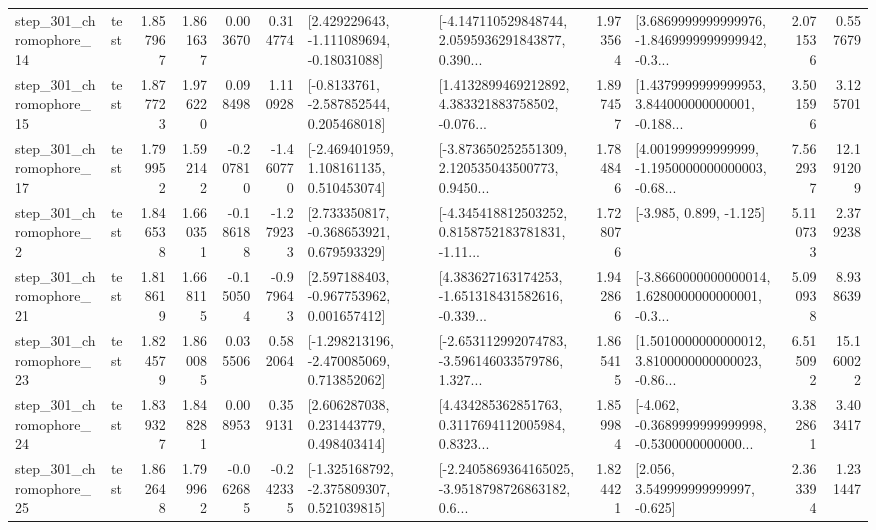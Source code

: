 \begin{tabular}{llrrrrllrlrr}
  step\_301\_chromophore\_14 &      test &      1.857967 &    1.861637 &      0.003670 &  0.314774 &    [2.429229643, -1.111089694, -0.18031088] &  [-4.147110529848744, 2.0595936291843877, 0.390... &       1.973564 &  [3.6869999999999976, -1.8469999999999942, -0.3... &            2.071536 &          0.557679 \\
  step\_301\_chromophore\_15 &      test &      1.877723 &    1.976220 &      0.098498 &  1.110928 &     [-0.8133761, -2.587852544, 0.205468018] &  [1.4132899469212892, 4.383321883758502, -0.076... &       1.897457 &  [1.4379999999999953, 3.844000000000001, -0.188... &            3.501596 &          3.125701 \\
  step\_301\_chromophore\_17 &      test &      1.799952 &    1.592142 &     -0.207810 & -1.460770 &    [-2.469401959, 1.108161135, 0.510453074] &  [-3.873650252551309, 2.120535043500773, 0.9450... &       1.784846 &  [4.001999999999999, -1.1950000000000003, -0.68... &            7.562937 &         12.191209 \\
   step\_301\_chromophore\_2 &      test &      1.846538 &    1.660351 &     -0.186188 & -1.279233 &    [2.733350817, -0.368653921, 0.679593329] &  [-4.345418812503252, 0.8158752183781831, -1.11... &       1.728076 &                            [-3.985, 0.899, -1.125] &            5.110733 &          2.379238 \\
  step\_301\_chromophore\_21 &      test &      1.818619 &    1.668115 &     -0.150504 & -0.979643 &    [2.597188403, -0.967753962, 0.001657412] &  [4.383627163174253, -1.651318431582616, -0.339... &       1.942866 &  [-3.8660000000000014, 1.6280000000000001, -0.3... &            5.090938 &          8.938639 \\
  step\_301\_chromophore\_23 &      test &      1.824579 &    1.860085 &      0.035506 &  0.582064 &   [-1.298213196, -2.470085069, 0.713852062] &  [-2.653112992074783, -3.596146033579786, 1.327... &       1.865415 &  [1.5010000000000012, 3.8100000000000023, -0.86... &            6.515092 &         15.160022 \\
  step\_301\_chromophore\_24 &      test &      1.839327 &    1.848281 &      0.008953 &  0.359131 &     [2.606287038, 0.231443779, 0.498403414] &  [4.434285362851763, 0.3117694112005984, 0.8323... &       1.859984 &  [-4.062, -0.3689999999999998, -0.5300000000000... &            3.382861 &          3.403417 \\
  step\_301\_chromophore\_25 &      test &      1.862648 &    1.799962 &     -0.062685 & -0.242335 &   [-1.325168792, -2.375809307, 0.521039815] &  [-2.2405869364165025, -3.9518798726863182, 0.6... &       1.824421 &                 [2.056, 3.549999999999997, -0.625] &            2.363394 &          1.231447 \\

\end{tabular}
